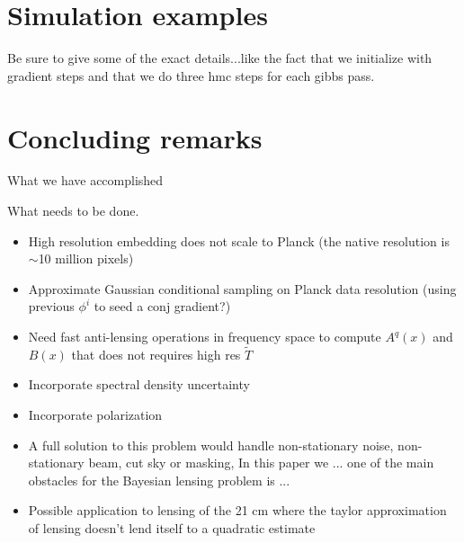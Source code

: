 \documentclass[noinfoline]{imsart}
\begin{document}
%
%
\section{Simulation examples}
\label{Section: simulation examples}


Be sure to give some of the exact details...like the fact that we initialize with gradient steps and that we do three hmc steps for each gibbs pass.

%
%
\section{Concluding remarks}

What we have accomplished

What needs to be done.
\begin{itemize}
 \item High resolution embedding does not scale to Planck (the native resolution is $\sim$10 million pixels)
\item Approximate Gaussian conditional sampling on Planck data resolution (using previous $\phi^{i}$ to seed a conj gradient?)
\item Need fast anti-lensing operations in frequency space to compute $A^q(x)$ and $B(x)$ that does not requires high res $\tilde T$
\item Incorporate spectral density uncertainty
\item Incorporate polarization
\item A full solution to this problem would handle non-stationary noise, non-stationary beam, cut sky or masking, In this paper we ... one of the main obstacles for the Bayesian lensing problem is ...
\item Possible application to lensing of the 21 cm where the taylor approximation of lensing doesn't lend itself to a quadratic estimate
\end{itemize}










%
%
\appendix

\section{}
\end{document}
